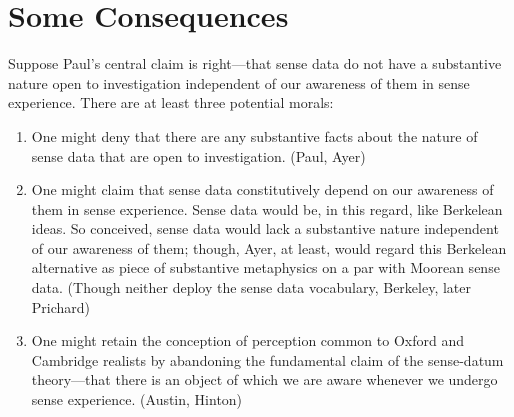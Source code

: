 \documentclass[11pt]{article}
\begin{document}

\section{Some Consequences} %
\label{sec:some_consequences}

Suppose Paul's central claim is right---that sense data do not have a substantive nature open to investigation independent of our awareness of them in sense experience. There are at least three potential morals:
\begin{enumerate}
    \item One might deny that there are any substantive facts about the nature of sense data that are open to investigation. (Paul, Ayer)
    \item One might claim that sense data constitutively depend on our awareness of them in sense experience. Sense data would be, in this regard, like Berkelean ideas. So conceived, sense data would lack a substantive nature independent of our awareness of them; though, Ayer, at least, would regard this Berkelean alternative as piece of substantive metaphysics on a par with Moorean sense data. (Though neither deploy the sense data vocabulary, Berkeley, later Prichard)
    \item One might retain the conception of perception common to Oxford and Cambridge realists by abandoning the fundamental claim of the sense-datum theory---that there is an object of which we are aware whenever we undergo sense experience. (Austin, Hinton)
\end{enumerate}

\end{document}
